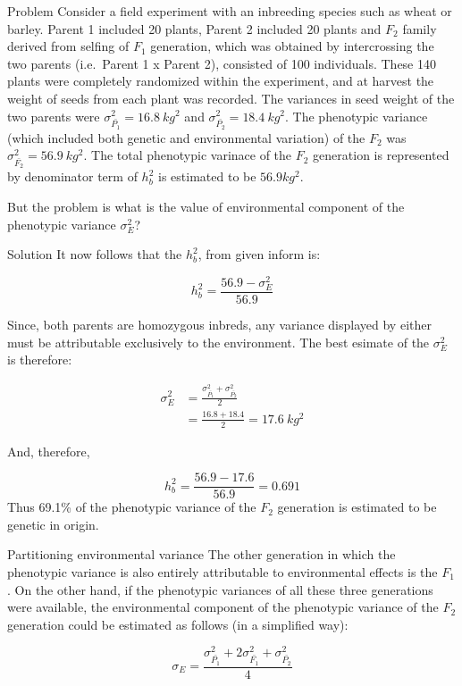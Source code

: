 \documentclass[11pt,dvipsnames,ignorenonframetext,aspectratio=169]{beamer}
\begin{document}
\begin{frame}{Problem}
\protect\hypertarget{problem}{}
Consider a field experiment with an inbreeding species such as wheat or
barley. Parent 1 included 20 plants, Parent 2 included 20 plants and
\(F_2\) family derived from selfing of \(F_1\) generation, which was
obtained by intercrossing the two parents (i.e.~Parent 1 x Parent 2),
consisted of 100 individuals. These 140 plants were completely
randomized within the experiment, and at harvest the weight of seeds
from each plant was recorded. The variances in seed weight of the two
parents were \(\sigma_{\bar{P_1}}^2 = 16.8~kg^2\) and
\(\sigma_{\bar{P_2}}^2 = 18.4~kg^2\). The phenotypic variance (which
included both genetic and environmental variation) of the \(F_2\) was
\(\sigma_{\bar{F_2}}^2 = 56.9~kg^2\). The total phenotypic varinace of
the \(F_2\) generation is represented by denominator term of \(h_b^2\)
is estimated to be \(56.9 kg^2\).

But the problem is what is the value of environmental component of the
phenotypic variance \(\sigma_E^2\)?
\end{frame}

\begin{frame}{Solution}
\protect\hypertarget{solution-1}{}
It now follows that the \(h_b^2\), from given inform is:

\[
h_b^2 = \frac{56.9-\sigma_E^2}{56.9}
\]

Since, both parents are homozygous inbreds, any variance displayed by
either must be attributable exclusively to the environment. The best
esimate of the \(\sigma_E^2\) is therefore:

\[
\begin{aligned}
\sigma_E^2 &= \frac{\sigma_{\bar{P_1}}^2 + \sigma_{\bar{P_2}}^2}{2} \\
&= \frac{16.8 + 18.4}{2} = 17.6~kg^2
\end{aligned}
\]
\end{frame}

\begin{frame}{}
\protect\hypertarget{section-17}{}
And, therefore,

\[
h_b^2=\frac{56.9-17.6}{56.9} = 0.691
\] Thus 69.1\% of the phenotypic variance of the \(F_2\) generation is
estimated to be genetic in origin.
\end{frame}

\begin{frame}{Partitioning environmental variance}
\protect\hypertarget{partitioning-environmental-variance}{}
The other generation in which the phenotypic variance is also entirely
attributable to environmental effects is the \(F_1\). On the other hand,
if the phenotypic variances of all these three generations were
available, the environmental component of the phenotypic variance of the
\(F_2\) generation could be estimated as follows (in a simplified way):

\[
\sigma_E = \frac{\sigma_{\bar{P_1}}^2 + 2\sigma_{\bar{F_1}}^2 + \sigma_{\bar{P_2}}^2}{4}
\tag{iv}
\]
\end{frame}
\end{document}

